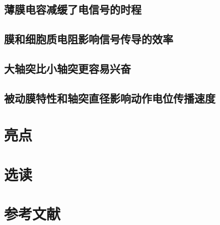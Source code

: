 \subsection{薄膜电容减缓了电信号的时程}
\subsection{膜和细胞质电阻影响信号传导的效率}
\subsection{大轴突比小轴突更容易兴奋}
\subsection{被动膜特性和轴突直径影响动作电位传播速度}

\section{亮点}

\section{选读}

\section{参考文献}







